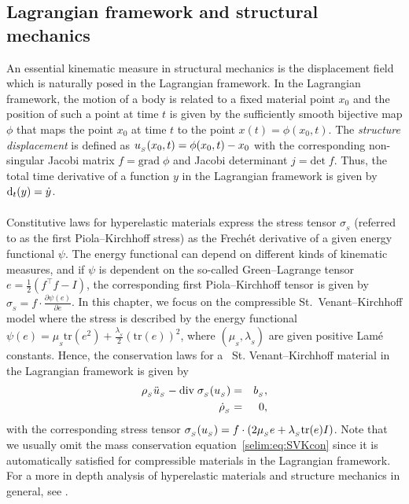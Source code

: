 \subsection{ Lagrangian framework and structural mechanics}

An essential kinematic measure in structural mechanics is the
displacement field which is naturally posed in the Lagrangian
framework.  In the Lagrangian framework, the motion of a body is
related to a fixed material point $x_0$ and the position of
such a point at time $t$ is given by the sufficiently smooth bijective
map $\phi$ that maps the point $x_0$ at time $t$ to the point $x(t)=
\phi(x_0,t)$. The \emph{structure displacement} is defined as
$u_{_{S}}(x_0,t) = \phi(x_0, t) - x_0$ with the corresponding non-singular
Jacobi matrix $f = \textrm{grad}\;\phi$ and Jacobi determinant $j =
\textrm{det}\; f$. Thus, the total time derivative of a function $y$
in the Lagrangian framework is given by $\textrm{d}_t(y) = \dot{y}$.
\\\\
Constitutive laws for hyperelastic materials express the stress
tensor $\sigma_{_{S}}$ (referred to as the first Piola--Kirchhoff
stress) as the Frech\'{e}t derivative of a given energy functional
$\psi$.  The energy functional can depend on different kinds of
kinematic measures, and if $\psi$ is dependent on the so-called
Green--Lagrange tensor $e= \tfrac{1}{2}(f^{\top}f -I)$, the corresponding first
Piola--Kirchhoff tensor is given by $\sigma_{_{S}} =
f\cdot\frac{\partial \psi(e)}{\partial e}$. In this chapter, we focus
on the compressible St.~Venant--Kirchhoff model where the stress is
described by the energy functional $\psi(e) =
\mu_{_{S}}\textrm{tr}(e^2) +
\frac{\lambda_{_{S}}}{2}(\textrm{tr}(e))^2$, where
$(\mu_{_{S}},\lambda_{_{S}})$ are given positive Lam\'{e}
constants. Hence, the conservation laws for a ~St. Venant--Kirchhoff
material in the Lagrangian framework is given by
\begin{eqnarray}
\label{selim:eq:SVKmom}
\rho_{_{S}} \ddot{u}_{_{S}} - \textrm{div}\;\sigma_{_{S}}(u_{_{S}}) &=& b_{_{S}}, \\
\label{selim:eq:SVKcon}
\dot{\rho}_{_{S}}&=&0,
\end{eqnarray}
with the corresponding stress tensor $\sigma_{_{S}}(u_{_{S}}) =
f\cdot(2\mu_{_{S}}e + \lambda_{_{S}} \textrm{tr}(e)I)$.  Note that we
usually omit the mass conservation equation~\eqref{selim:eq:SVKcon}
since it is automatically satisfied for compressible materials in the
Lagrangian framework.  For a more in depth analysis of hyperelastic
materials and structure mechanics in general, see \citet{Gurtin1981,
  Holzapfel2000, Narayanan2007}.

